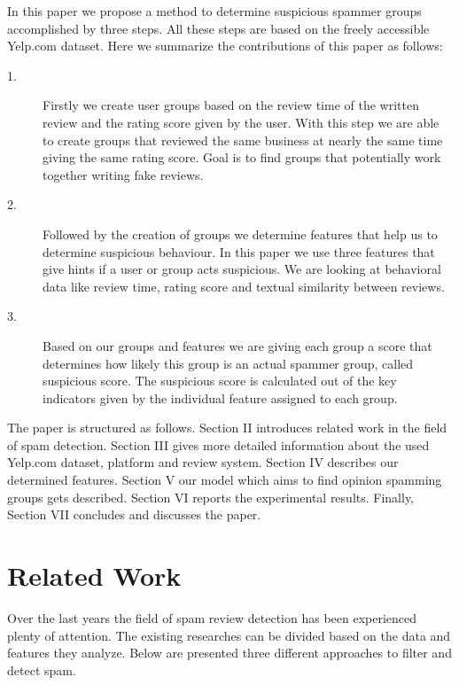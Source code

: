\documentclass[conference]{IEEEtran}  %
\theoremstyle{plain}
\theoremstyle{definition}
\theoremstyle{remark}
\begin{document}
In this paper we propose a method to determine suspicious spammer groups accomplished by three steps. All these steps are based on the freely accessible Yelp.com dataset. Here we summarize the contributions of this paper as follows:
\begin{description}
\item[1.]
Firstly we create user groups based on the review time of the written review and the rating score given by the user. With this step we are able to create groups that reviewed the same business at nearly the same time giving the same rating score. Goal is to find groups that potentially work together writing fake reviews. 
\item[2.]
Followed by the creation of groups we determine features that help us to determine suspicious behaviour. In this paper we use three features that give hints if a user or group acts suspicious. We are looking at behavioral data like review time, rating score and textual similarity between reviews. 
\item[3.]
Based on our groups and features we are giving each group a score that determines how likely this group is an actual spammer group, called suspicious score. The suspicious score is calculated out of the key indicators given by the individual feature assigned to each group. 
\end{description}
The paper is structured as follows. Section II introduces related work in the field of spam detection. Section III gives more detailed information about the used Yelp.com dataset, platform and review system. Section IV describes our determined features. Section V our model which aims to find opinion spamming groups gets described. Section VI reports the experimental results. Finally, Section VII concludes and discusses the paper.


\section{Related Work}
\label{sec:related_work}

Over the last years the field of spam review detection has been experienced plenty of attention. The existing researches can be divided based on the data and features they analyze. Below are presented three different approaches to filter and detect spam. %
\end{document}
